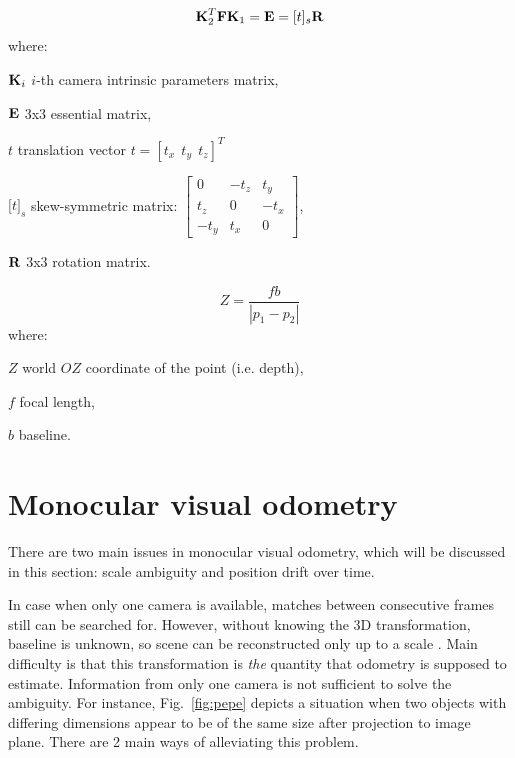 \begin{equation}
\textbf{K}_{2}^{T}\textbf{F}\textbf{K}_{1}=\textbf{E}=[t]_{s}\textbf{R}
\label{eq:ess}
\end{equation}
where:
\begin{eqwhere}[2cm]
	\item[$\textbf{K}_{i}$] $i$-th camera intrinsic parameters matrix,
	\item[$\textbf{E}$] 3x3 essential matrix,
	\item[$t$] translation vector $t=[t_{x}\ \ t_{y}\ \ t_{z}]^T$
	\item[$\lbrack t \rbrack _{s}$] skew-symmetric matrix: $\begin{bmatrix}
		0 & -t_{z} & t_{y} \\ 
		t_{z} & 0 & -t_{x} \\ 
		-t_{y} & t_{x} & 0
	\end{bmatrix}$,
	\item[$\textbf{R}$] 3x3 rotation matrix.
\end{eqwhere}

\begin{equation}
Z = \frac{fb}{|p_{1}-p_{2}|}
\label{eq:disparity}
\end{equation}
where:
\begin{eqwhere}[2cm]
	\item[$Z$] world $OZ$ coordinate of the point (i.e. depth),
	\item[$f$] focal length,
	\item[$b$] baseline.
\end{eqwhere}


\section{Monocular visual odometry}
\label{sec:mono}

There are two main issues in monocular visual odometry, which will be discussed in this section: scale ambiguity and position drift over time.

In case when only one camera is available, matches between consecutive frames still can be searched for. However, without knowing the 3D transformation, baseline is unknown, so scene can be reconstructed only up to a scale \cite{hartley2003multiple} \cite{szeliski}. Main difficulty is that this transformation is \textit{the} quantity that odometry is supposed to estimate. Information from only one camera is not sufficient to solve the ambiguity. For instance, Fig.~\ref{fig:pepe} depicts a situation when two objects with differing dimensions appear to be of the same size after projection to image plane. There are 2 main ways of alleviating this problem.

